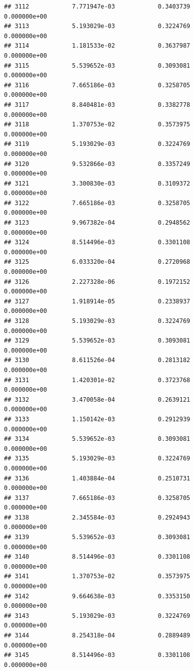 \documentclass[
]{article}
\begin{document}
\begin{verbatim}
## 3112            7.771947e-03            0.3403739            0.000000e+00
## 3113            5.193029e-03            0.3224769            0.000000e+00
## 3114            1.181533e-02            0.3637987            0.000000e+00
## 3115            5.539652e-03            0.3093081            0.000000e+00
## 3116            7.665186e-03            0.3258705            0.000000e+00
## 3117            8.840481e-03            0.3382778            0.000000e+00
## 3118            1.370753e-02            0.3573975            0.000000e+00
## 3119            5.193029e-03            0.3224769            0.000000e+00
## 3120            9.532866e-03            0.3357249            0.000000e+00
## 3121            3.300830e-03            0.3109372            0.000000e+00
## 3122            7.665186e-03            0.3258705            0.000000e+00
## 3123            9.967382e-04            0.2948562            0.000000e+00
## 3124            8.514496e-03            0.3301108            0.000000e+00
## 3125            6.033320e-04            0.2720968            0.000000e+00
## 3126            2.227328e-06            0.1972152            0.000000e+00
## 3127            1.918914e-05            0.2338937            0.000000e+00
## 3128            5.193029e-03            0.3224769            0.000000e+00
## 3129            5.539652e-03            0.3093081            0.000000e+00
## 3130            8.611526e-04            0.2813182            0.000000e+00
## 3131            1.420301e-02            0.3723768            0.000000e+00
## 3132            3.470058e-04            0.2639121            0.000000e+00
## 3133            1.150142e-03            0.2912939            0.000000e+00
## 3134            5.539652e-03            0.3093081            0.000000e+00
## 3135            5.193029e-03            0.3224769            0.000000e+00
## 3136            1.403884e-04            0.2510731            0.000000e+00
## 3137            7.665186e-03            0.3258705            0.000000e+00
## 3138            2.345584e-03            0.2924943            0.000000e+00
## 3139            5.539652e-03            0.3093081            0.000000e+00
## 3140            8.514496e-03            0.3301108            0.000000e+00
## 3141            1.370753e-02            0.3573975            0.000000e+00
## 3142            9.664638e-03            0.3353150            0.000000e+00
## 3143            5.193029e-03            0.3224769            0.000000e+00
## 3144            8.254318e-04            0.2889489            0.000000e+00
## 3145            8.514496e-03            0.3301108            0.000000e+00

\end{verbatim}
\end{document}
